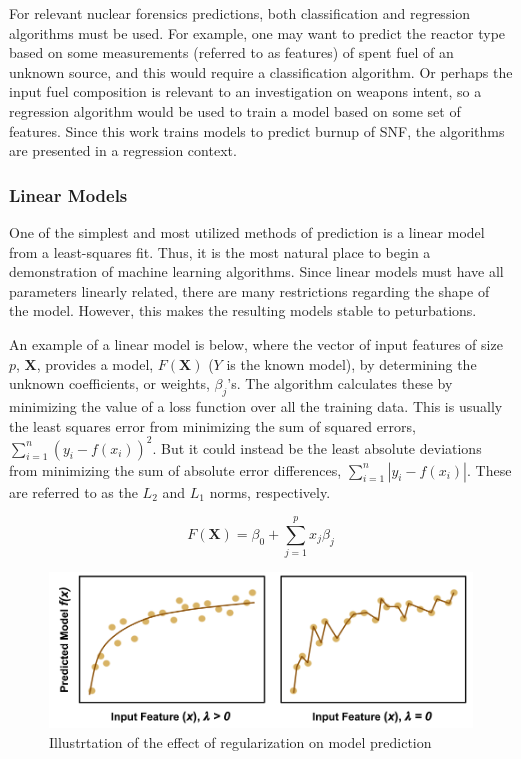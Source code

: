 For relevant nuclear forensics predictions, both classification and regression
algorithms must be used.  For example, one may want to predict the reactor type
based on some measurements (referred to as features) of spent fuel of an
unknown source, and this would require a classification algorithm. Or perhaps
the input fuel composition is relevant to an investigation on weapons intent,
so a regression algorithm would be used to train a model based on some set of
features.  Since this work trains models to predict burnup of \gls{SNF}, the 
algorithms are presented in a regression context.

\subsubsection{Linear Models}
\label{sec:linear}

One of the simplest and most utilized methods of prediction is a linear model
from a least-squares fit. Thus, it is the most natural place to begin a
demonstration of machine learning algorithms. Since linear models must have all
parameters linearly related, there are many restrictions regarding the shape of
the model. However, this makes the resulting models stable to peturbations. 

An example of a linear model is below, where the vector of input features of
size $p$, $\boldsymbol{X}$, provides a model, $F(\boldsymbol{X})$ ($Y$ is the
known model), by determining the unknown coefficients, or weights,
$\beta_{j}$'s. The algorithm calculates these by minimizing the value of a loss
function over all the training data.  This is usually the least squares error
from minimizing the sum of squared errors, $\sum_{i=1}^{n} (y_i - f(x_i))^2$.
But it could instead be the least absolute deviations from minimizing the sum
of absolute error differences, $\sum_{i=1}^{n} |y_i - f(x_i)|$. These are
referred to as the $L_2$ and $L_1$ norms, respectively.  

\begin{equation}
  F(\boldsymbol{X}) = \beta_{0} +  \sum_{j=1}^{p} x_{j} \beta_{j}
\end{equation}

\begin{figure}[!htb]
  \centering
  \includegraphics[width=\linewidth]{./chapters/litrev/regularization.png}
  \caption{Illustrtation of the effect of regularization on model prediction}
  \label{fig:reg}
\end{figure}

